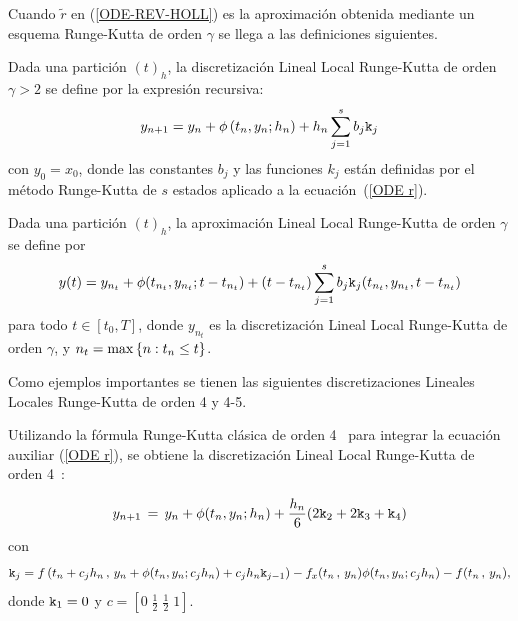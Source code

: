 Cuando $\widetilde{r}$ en (\ref{ODE-REV-HOLL})  es la aproximación obtenida mediante un esquema Runge-Kutta de orden $\gamma$ se llega a las definiciones siguientes.
\begin{definition}
	\label{definition HLLD} \cite{Jimenez13} Dada una partición $(t)_{h}$, la discretización Lineal Local Runge-Kutta 
    de orden $\gamma >2$ se define por la expresión recursiva:
	\begin{equation*}
	y_{n+1}=y_{n}+\phi \left( t_{n},y_{n};h_{n}\right) +h_{n}\sum_{j=1}^{s}b_{j}\mathtt{k}_{j}
	\end{equation*}%
	con $y_{0}=x_{0}$, donde las constantes $b_{j}$ y las funciones $k_{j}$ están definidas por el método Runge-Kutta de $s$ estados aplicado a la ecuación~(\ref{ODE r}).
\end{definition}
\begin{definition}
	\label{definition HOLLA} \cite{Jimenez13} Dada una partición $(t)_{h}$, la aproximación Lineal Local Runge-Kutta de orden $\gamma$ se define por 
	\begin{equation*}
	y(t)=y_{n_{t}}+\phi(t_{n_{t}},y_{n_{t}};t-t_{n_{t}})+(t-t_{n_{t}})%
	\sum_{j=1}^{s}b_{j}\kt_{j}(t_{n_{t}},y_{n_{t}},t-t_{n_{t}}) %
	\end{equation*}
	para todo $t\in[t_{0},T]$, donde $y_{n_{t}}$ es la discretización Lineal Local Runge-Kutta de orden $\gamma$, y $n_{t}=\max\left\{ n:t_{n}\leq t \right\}$.
\end{definition}

Como ejemplos importantes se tienen las siguientes discretizaciones Lineales Locales Runge-Kutta de orden 4 y 4-5.

Utilizando la fórmula Runge-Kutta clásica de orden 4~\cite{hairer1993solving} para integrar la ecuación auxiliar (\ref{ODE r}), se obtiene la discretización Lineal Local Runge-Kutta de orden 4~\cite{Jimenez13}:

\begin{equation}
    y_{n+1}\,=\,y_n+\phi(t_n,y_n;h_n)+\frac{h_n}{6}(2\mathtt{k}_2+2\mathtt{k}_3+\mathtt{k}_4)
    \label{LL-scheme-4}
\end{equation}
con
    \[ \mathtt{k}_j = f\left( t_n+c_jh_n\, , \, y_n+\phi(t_n,y_n;c_jh_n)+c_jh_n\mathtt{k}_{j-1} \right)
- f_x(t_n\, , \, y_n)\phi(t_n,y_n;c_jh_n) - f(t_n\, ,\, y_n) ,\]
donde $\mathtt{k}_1=0$ y $c = \left[ 0 \; \frac{1}{2} \; \frac{1}{2} \; 1  \right]$.

